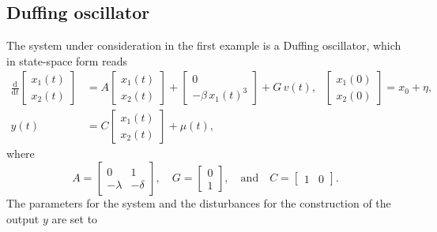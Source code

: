 \documentclass[11pt,reqno]{amsart}
\numberwithin{equation}{section}
\theoremstyle{plain}
\begin{document}
%
\subsection{Duffing oscillator}
%
The system under consideration in the first example is a Duffing oscillator, which in state-space form reads
%
\begin{equation}\label{eq: Duffing}
	\begin{aligned}
		\frac{\mathrm{d}}{\mathrm{d}t} \begin{bmatrix} x_1(t) \\ x_2(t) \end{bmatrix} &= 
		A
		\begin{bmatrix} x_1(t) \\ x_2(t) \end{bmatrix} 
		+ 
		\begin{bmatrix}
			0 \\ 
			- \beta \, x_1(t)^3
		\end{bmatrix} + G \, v(t),~~~
		\begin{bmatrix} x_1(0) \\ x_2(0) \end{bmatrix} = x_0 + \eta,\\
		y(t) &= C \begin{bmatrix} x_1(t) \\ x_2(t) \end{bmatrix} + \mu(t),
	\end{aligned}
\end{equation}
%
where
%
\begin{equation*}
	A= \begin{bmatrix}
		0 & 1 \\
		- \lambda & - \delta
	\end{bmatrix},
    \quad
	G = \begin{bmatrix} 0 \\ 1 \end{bmatrix},
    \quad\text{and}\quad
	C = \begin{bmatrix} 1 & 0\end{bmatrix}.
\end{equation*}
%
The parameters for the system and the disturbances for the construction of the output $y$ are set to 
\end{document}
